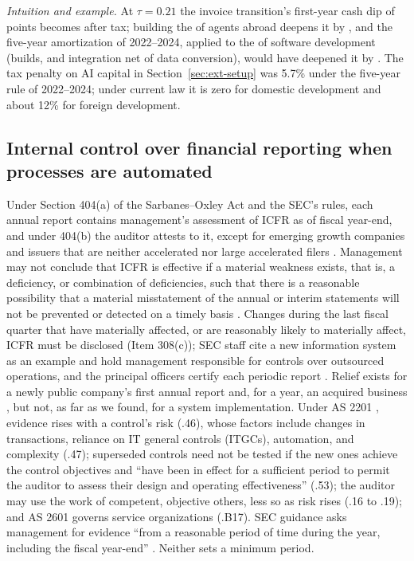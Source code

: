 \noindent\emph{Intuition and example.} At $\tau=0.21$ the invoice transition's first-year cash dip of \acctExCashOne{} points becomes \acctTaxAfter{} after tax; building the \acctExBuilds{} of agents abroad deepens it by \acctTaxForeign, and the five-year amortization of 2022--2024, applied to the \acctTaxSD{} of software development (builds, and integration net of data conversion), would have deepened it by \acctTaxPrior. The tax penalty on AI capital in Section~\ref{sec:ext-setup} was 5.7\% under the five-year rule of 2022--2024; under current law it is zero for domestic development and about 12\% for foreign development.

\subsection{Internal control over financial reporting when processes are automated}\label{sec:acct-icfr}

Under Section 404(a) of the Sarbanes--Oxley Act and the SEC's rules, each annual report contains management's assessment of ICFR as of fiscal year-end, and under 404(b) the auditor attests to it, except for emerging growth companies and issuers that are neither accelerated nor large accelerated filers \citep{usc2026sec7262,cfr2026sec229308}. Management may not conclude that ICFR is effective if a material weakness exists, that is, a deficiency, or combination of deficiencies, such that there is a reasonable possibility that a material misstatement of the annual or interim statements will not be prevented or detected on a timely basis \citep{cfr2026sec24012b2}. Changes during the last fiscal quarter that have materially affected, or are reasonably likely to materially affect, ICFR must be disclosed (Item 308(c)); SEC staff cite a new information system as an example and hold management responsible for controls over outsourced operations, and the principal officers certify each periodic report \citep{sec2007faq,usc2026sec7241}. Relief exists for a newly public company's first annual report and, for a year, an acquired business \citep{cfr2026sec229308,sec2007faq}, but not, as far as we found, for a system implementation. Under AS 2201 \citep{pcaob2026as2201}, evidence rises with a control's risk (.46), whose factors include changes in transactions, reliance on IT general controls (ITGCs), automation, and complexity (.47); superseded controls need not be tested if the new ones achieve the control objectives and ``have been in effect for a sufficient period to permit the auditor to assess their design and operating effectiveness'' (.53); the auditor may use the work of competent, objective others, less so as risk rises (.16 to .19); and AS 2601 governs service organizations (.B17). SEC guidance asks management for evidence ``from a reasonable period of time during the year, including the fiscal year-end'' \citep{sec2007guidance}. Neither sets a minimum period.

